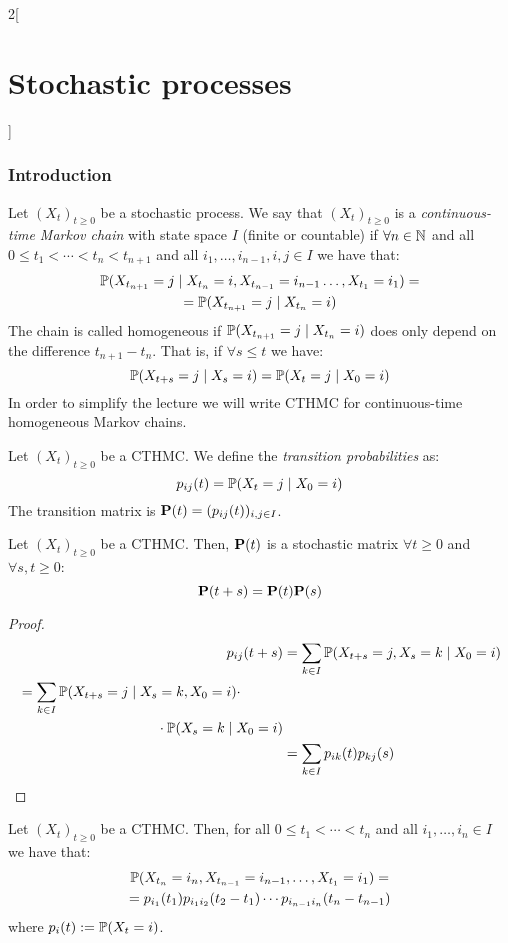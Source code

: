 \documentclass[../../../main_math.tex]{subfiles}
\begin{document}
\begin{multicols}{2}[\section{Stochastic processes}]
  \subsubsection{Introduction}
  \begin{definition}
    Let ${(X_t)}_{t\geq 0}$ be a stochastic process. We say that ${(X_t)}_{t\geq 0}$ is a \emph{continuous-time Markov chain} with state space $I$ (finite or countable) if $\forall n\in\mathbb{N}$ and all $0\leq t_1<\cdots<t_n<t_{n+1}$ and all $i_1,\ldots,i_{n-1},i,j\in I$ we have that:
    \begin{multline*}
      \mathbb{P}(X_{t_{n+1}}=j\mid X_{t_n}=i, X_{t_{n-1}}=i_{n-1}\ldots,X_{t_1}=i_1)=\\=\mathbb{P}(X_{t_{n+1}}=j\mid X_{t_n}=i)
    \end{multline*}
    The chain is called homogeneous if $\mathbb{P}(X_{t_{n+1}}=j\mid X_{t_n}=i)$ does only depend on the difference $t_{n+1}-t_n$. That is, if $\forall s\leq t$ we have:
    $$
      \mathbb{P}(X_{t+s}=j\mid X_{s}=i)=\mathbb{P}(X_{t}=j\mid X_0=i)
    $$
    In order to simplify the lecture we will write CTHMC for continuous-time homogeneous Markov chains.
  \end{definition}
  \begin{definition}
    Let ${(X_t)}_{t\geq 0}$ be a CTHMC. We define the \emph{transition probabilities} as:
    $$
      p_{ij}(t)=\mathbb{P}(X_t=j\mid X_0=i)
    $$
    The transition matrix is $\boldsymbol{\mathrm{P}}(t)=(p_{ij}(t))_{i,j\in I}$.
  \end{definition}
  \begin{proposition}\label{SP:ChapKolmo_continuous}
    Let ${(X_t)}_{t\geq 0}$ be a CTHMC. Then, $\boldsymbol{\mathrm{P}}(t)$ is a stochastic matrix $\forall t\geq 0$ and $\forall s,t \geq 0$: $$\boldsymbol{\mathrm{P}}(t+s)=\boldsymbol{\mathrm{P}}(t)\boldsymbol{\mathrm{P}}(s)$$
  \end{proposition}
  \begin{proof}
    \begin{align*}
      p_{ij}(t+s) & =\sum_{k\in I} \Prob(X_{t+s}=j,X_s=k\mid X_0=i) \\
      \begin{split}
         & =\sum_{k\in I} \Prob(X_{t+s}=j\mid X_s=k,X_0=i)\cdot \\
         & \hspace{3.5cm}\cdot\Prob(X_s=k\mid X_0=i)            \\
      \end{split}       \\
                  & =\sum_{k\in I} p_{ik}(t)p_{kj}(s)
    \end{align*}
  \end{proof}
  \begin{proposition}
    Let ${(X_t)}_{t\geq 0}$ be a CTHMC. Then, for all $0\leq t_1 < \cdots < t_n$ and all $i_1,\ldots,i_{n}\in I$ we have that:
    \begin{multline*}
      \mathbb{P}(X_{t_n}=i_n,X_{t_{n-1}}=i_{n-1},\ldots,X_{t_1}=i_1)=\\
      =p_{i_1}(t_1)p_{i_1i_2}(t_2-t_1)\cdots p_{i_{n-1}i_n}(t_n-t_{n-1})
    \end{multline*}
    where $p_{i}(t):= \mathbb{P}(X_t=i)$.
  \end{proposition}

\end{multicols}
\end{document}
